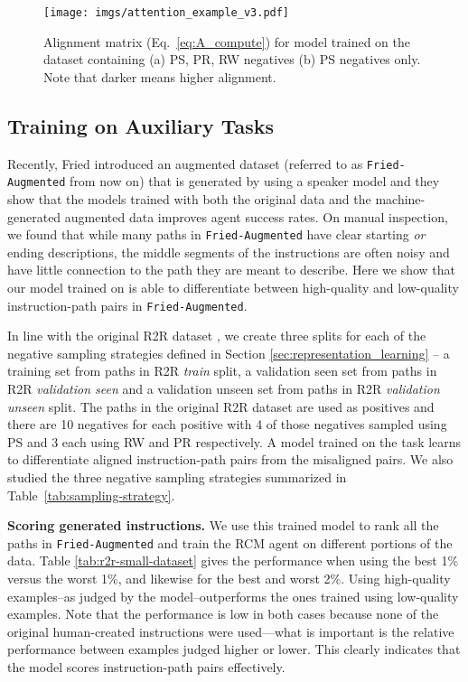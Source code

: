 \documentclass[10pt,twocolumn,letterpaper]{article}
\newcommand{\friedaug}{\texttt{Fried-Augmented}}
\begin{document}
\begin{figure*}
\centering
\texttt{[image: imgs/attention\_example\_v3.pdf]}
\caption{Alignment matrix (Eq.~\ref{eq:A_compute}) for model trained on the dataset containing (a) PS, PR, RW negatives (b) PS negatives only. Note that darker means higher alignment. \label{fig:curriculum-learning-attention}}
\end{figure*}


\subsection{Training on Auxiliary Tasks}
Recently, Fried \etal \cite{Fried:2018:Speaker} introduced an augmented dataset (referred to as {\friedaug} from now on) that is generated by using a speaker model and they show that the models trained with both the original data and the machine-generated augmented data improves agent success rates. On manual inspection, we found that while many paths in {\friedaug} have clear starting \textit{or} ending descriptions, the middle segments of the instructions are often noisy and have little connection to the path they are meant to describe. Here we show that our model trained on {\taskcma} is able to differentiate between high-quality and low-quality instruction-path pairs in {\friedaug}.

In line with the original R2R dataset \cite{Anderson:2018:VLN}, we create three splits for each of the negative sampling strategies defined in Section \ref{sec:representation_learning} -- a training set from paths in R2R \textit{train} split, a validation seen set from paths in R2R \textit{validation seen} and a validation unseen set from paths in R2R \textit{validation unseen} split. The paths in the original R2R dataset are used as positives and there are 10 negatives for each positive with 4 of those negatives sampled using PS and 3 each using RW and PR respectively. A model trained on the task {\taskcma} learns to differentiate aligned instruction-path pairs from the misaligned pairs. We also studied the three negative sampling strategies summarized in Table~\ref{tab:sampling-strategy}.

\textbf{Scoring generated instructions.} We use this trained model to rank all the paths in {\friedaug} and train the RCM agent on different portions of the data. Table \ref{tab:r2r-small-dataset} gives the performance when using the best 1\% versus the worst 1\%, and likewise for the best and worst 2\%. Using high-quality examples--as judged by the model--outperforms the ones trained using low-quality examples. Note that the performance is low in both cases because none of the original human-created instructions were used---what is important is the relative performance between examples judged higher or lower. This clearly indicates that the model scores instruction-path pairs effectively.
\end{document}
